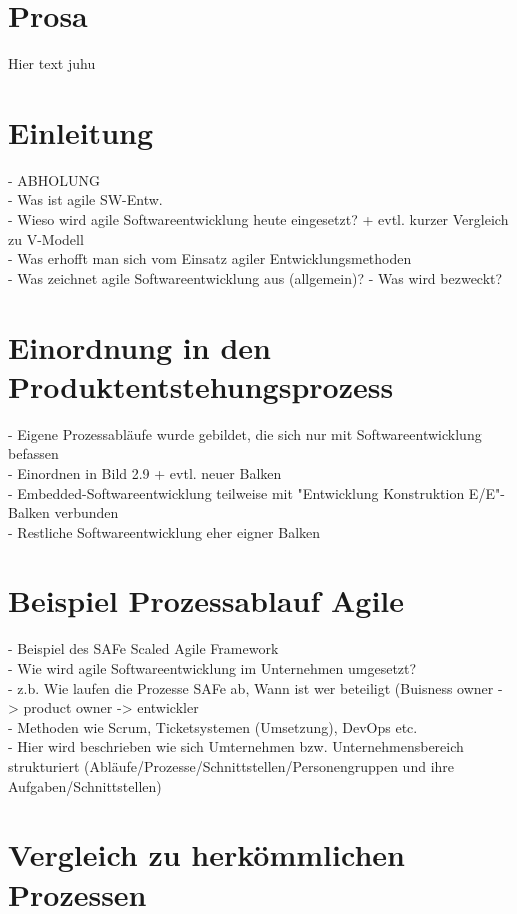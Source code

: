 \section{Prosa}\label{prosa}
Hier text juhu

\section{Einleitung}
- ABHOLUNG\\
- Was ist agile SW-Entw.\\
- Wieso wird agile Softwareentwicklung heute eingesetzt? + evtl. kurzer Vergleich zu V-Modell\\ 
- Was erhofft man sich vom Einsatz agiler Entwicklungsmethoden \\
- Was zeichnet agile Softwareentwicklung aus (allgemein)? - Was wird bezweckt?  \\
\section{Einordnung in den Produktentstehungsprozess}
- Eigene Prozessabläufe wurde gebildet, die sich nur mit Softwareentwicklung befassen\\
- Einordnen in Bild 2.9 + evtl. neuer Balken\\
- Embedded-Softwareentwicklung teilweise mit "Entwicklung Konstruktion E/E"-Balken verbunden\\
- Restliche Softwareentwicklung eher eigner Balken\\
\section{Beispiel Prozessablauf Agile}
- Beispiel des SAFe Scaled Agile Framework\\ 
- Wie wird agile Softwareentwicklung im Unternehmen umgesetzt? \\
- z.b. Wie laufen die Prozesse SAFe ab, Wann ist wer beteiligt (Buisness owner -> product owner -> entwickler\\
- Methoden wie Scrum, Ticketsystemen (Umsetzung), DevOps etc. \\ 
- Hier wird beschrieben wie sich Umternehmen bzw. Unternehmensbereich strukturiert (Abläufe/Prozesse/Schnittstellen/Personengruppen und ihre Aufgaben/Schnittstellen) \\ 
 
\section{Vergleich zu herkömmlichen Prozessen}


